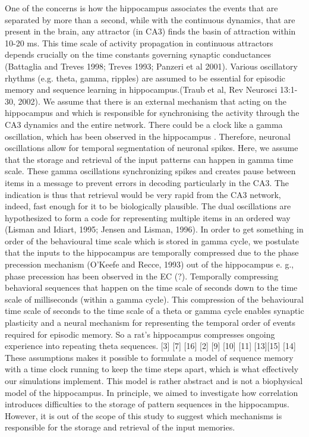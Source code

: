 \documentclass[utf8]{frontiersSCNS} %
\begin{document}
One of the concerns is how the hippocampus associates the events that are separated by more than a second, while with the continuous dynamics, that are present in the brain, any attractor (in CA3) finds the basin of attraction within 10-20 ms. This time scale of activity propagation in continuous attractors depends crucially on the time constants governing synaptic conductances (Battaglia and Treves 1998; Treves 1993; Panzeri et al 2001). 
%
Various oscillatory rhythms (e.g. theta, gamma, ripples) are assumed to be essential for episodic memory and sequence learning in hippocampus.(Traub et al, Rev Neurosci 13:1-30, 2002).
%
We assume that there is an external mechanism that acting on the hippocampus and which is responsible for synchronising the activity through the CA3 dynamics and the entire network. There could be a clock like a gamma oscillation, which has been observed in the hippocampus \citep{jensen2007human}. Therefore, neuronal oscillations allow for temporal segmentation of neuronal spikes. 
%
Here, we assume that the storage and retrieval of the input patterns can happen in gamma time scale.
%
These gamma oscillations synchronizing spikes and creates pause between items in a message to prevent errors in decoding particularly in the CA3. 
%
The indication is thus that retrieval would be very rapid from the CA3 network, indeed, fast enough for it to be biologically plausible.
%
The dual oscillations are hypothesized to form a code for representing multiple items in an ordered way (Lisman and Idiart, 1995; Jensen and Lisman, 1996). 
%
In order to get something in order of the behavioural time scale which is stored in gamma cycle, we postulate that the inputs to the hippocampus are temporally compressed due to the phase precession mechanism (O'Keefe and Recce, 1993) out of the hippocampus e. g., phase precession has been observed in the EC (?). 
%
Temporally compressing behavioral sequences that happen on the time scale of seconds down to the time scale of milliseconds (within a gamma cycle). This compression of the behavioural time scale of seconds to the time scale of a theta or gamma cycle enables synaptic plasticity and a neural mechanism for representing the temporal order of events required for episodic memory. So a rat's hippocampus compresses ongoing experience into repeating theta sequences. [3] [7] [16] [2] [9] [10] [11] [13][15] [14]
%
These assumptions makes it possible to formulate a model of sequence memory with a time clock running to keep the time steps apart, which is what effectively our simulations implement. 
%
This model is rather abstract and is not a biophysical model of the hippocampus. In principle, we aimed to investigate how correlation introduces difficulties to the storage of pattern sequences in the hippocampus.
However, it is out of the scope of this study to suggest which mechanisms is responsible for the storage and retrieval of the input memories.   
%
\end{document}

